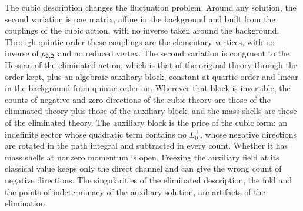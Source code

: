 The cubic description changes the fluctuation problem.
Around any solution, the second variation is one matrix, affine in the background and built from the couplings of the cubic action, with no inverse taken around the background.
Through quintic order these couplings are the elementary vertices, with no inverse of $p_{2,2}$ and no reduced vertex.
The second variation is congruent to the Hessian of the eliminated action, which is that of the original theory through the order kept, plus an algebraic auxiliary block, constant at quartic order and linear in the background from quintic order on.
Wherever that block is invertible, the counts of negative and zero directions of the cubic theory are those of the eliminated theory plus those of the auxiliary block, and the mass shells are those of the eliminated theory.
The auxiliary block is the price of the cubic form: an indefinite sector whose quadratic term contains no $L_0^+$, whose negative directions are rotated in the path integral and subtracted in every count.
Whether it has mass shells at nonzero momentum is open.
Freezing the auxiliary field at its classical value keeps only the direct channel and can give the wrong count of negative directions.
The singularities of the eliminated description, the fold and the points of indeterminacy of the auxiliary solution, are artifacts of the elimination.
